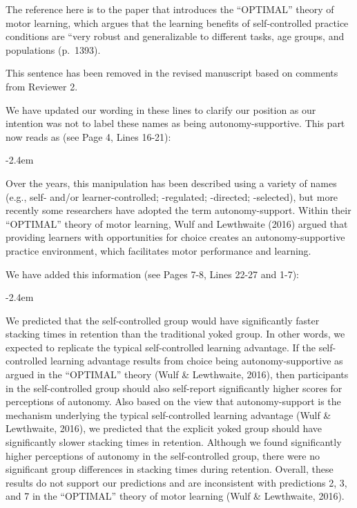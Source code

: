 \documentclass[final]{article}
\renewenvironment{quote}{\begin{fquote}\advance\leftmargini -2.4em\begin{oldquote}}{\end{oldquote}\end{fquote}}
\newenvironment{fquote}
  {\def\FrameCommand{
	\fboxsep=0.6em %
	\fcolorbox{black}{white}}%
    \MakeFramed {\advance\hsize-2\width \FrameRestore}
    \begin{minipage}{\linewidth}
  }
  {\end{minipage}\endMakeFramed}
\begin{document}

The reference here is to the paper that introduces the ``OPTIMAL'' theory of motor learning, which argues that the learning benefits of self-controlled practice conditions are ``very robust and generalizable to different tasks, age groups, and populations (p.~1393).


This sentence has been removed in the revised manuscript based on comments from Reviewer 2.


We have updated our wording in these lines to clarify our position as our intention was not to label these names as being autonomy-supportive. This part now reads as (see Page 4, Lines 16-21):

\begin{quote}
Over the years, this manipulation has been described using a variety of names (e.g., self- and/or learner-controlled; -regulated; -directed; -selected), but more recently some researchers have adopted the term autonomy-support. Within their ``OPTIMAL'' theory of motor learning, Wulf and Lewthwaite (2016) argued that providing learners with opportunities for choice creates an autonomy-supportive practice environment, which facilitates motor performance and learning.
\end{quote}


We have added this information (see Pages 7-8, Lines 22-27 and 1-7):

\begin{quote}
We predicted that the self-controlled group would have significantly faster stacking times in retention than the traditional yoked group. In other words, we expected to replicate the typical self-controlled learning advantage. If the self-controlled learning advantage results from choice being autonomy-supportive as argued in the ``OPTIMAL'' theory (Wulf \& Lewthwaite, 2016), then participants in the self-controlled group should also self-report significantly higher scores for perceptions of autonomy. Also based on the view that autonomy-support is the mechanism underlying the typical self-controlled learning advantage (Wulf \& Lewthwaite, 2016), we predicted that the explicit yoked group should have significantly slower stacking times in retention. Although we found significantly higher perceptions of autonomy in the self-controlled group, there were no significant group differences in stacking times during retention. Overall, these results do not support our predictions and are inconsistent with predictions 2, 3, and 7 in the ``OPTIMAL'' theory of motor learning (Wulf \& Lewthwaite, 2016).
\end{quote}
\end{document}
